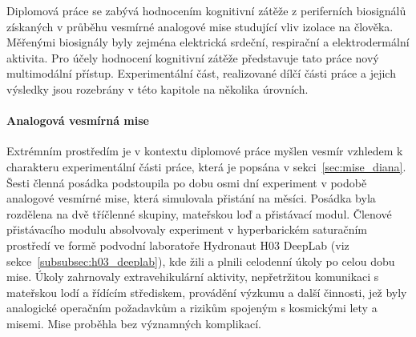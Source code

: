 Diplomová práce se zabývá hodnocením kognitivní zátěže z periferních biosignálů
získaných v průběhu vesmírné analogové mise studující vliv izolace na člověka.
Měřenými biosignály byly zejména elektrická srdeční, respirační a
elektrodermální aktivita. Pro účely hodnocení kognitivní zátěže představuje tato
práce nový multimodální přístup. Experimentální část, realizované dílčí části
práce a jejich výsledky jsou rozebrány v této kapitole na několika úrovních.

\paragraph{Analogová vesmírná mise}
Extrémním prostředím je v kontextu diplomové práce myšlen vesmír vzhledem k
charakteru experimentální části práce, která je popsána v
sekci~\ref{sec:mise_diana}. Šesti členná posádka podstoupila po dobu osmi dní
experiment v podobě analogové vesmírné mise, která simulovala přistání na
měsíci. Posádka byla rozdělena na dvě tříčlenné skupiny, mateřskou loď a
přistávací modul. Členové přistávacího modulu absolvovaly experiment v
hyperbarickém saturačním prostředí ve formě podvodní laboratoře Hydronaut H03
DeepLab (viz sekce~\ref{subsubsec:h03_deeplab}), kde žili a plnili celodenní
úkoly po celou dobu mise. Úkoly zahrnovaly extravehikulární aktivity,
nepřetržitou komunikaci s mateřskou lodí a řídícím střediskem, provádění výzkumu
a další činnosti, jež byly analogické operačním požadavkům a rizikům spojeným s
kosmickými lety a misemi. Mise proběhla bez významných komplikací.


